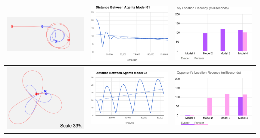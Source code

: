 \documentclass{article}
\begin{document}
\begin{table}[t]
	\centering
	\begin{tabular}{p{5.2cm}p{5.2cm}p{5.2cm} }
		
		\includegraphics[width=5cm]{model01-vpn}&
		\includegraphics[width=5cm]{distance01-vpn}& \includegraphics[width=5cm]{my_location_vpn}\\\hline 
		\includegraphics[width=5cm]{model02-vpn}&
		\includegraphics[width=5cm]{distance02-vpn}&
		\includegraphics[width=5cm]{opp_location_vpn}\\			

\end{tabular}
\end{table}
\end{document}
